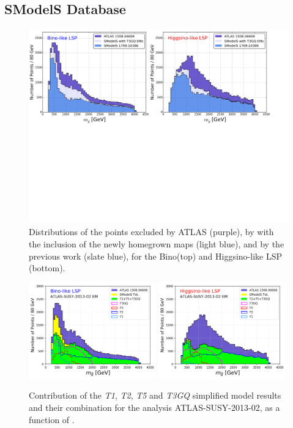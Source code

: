 \documentclass[epj,nopacs,fleqn]{svjour}
\begin{document}
\subsection{SModelS Database}
\begin{figure}
	\begin{center}
		\includegraphics[width=1\textwidth]{PLOTS/New/New_Res.pdf}	
	\end{center}
	\caption{Distributions of the points excluded by ATLAS (purple), by \SMO with the inclusion of the newly homegrown maps (light blue), and by the previous work \cite{Ambrogi:2017lov} (slate blue), for the Bino(top) and Higgsino-like LSP (bottom).}
	\label{pmssm_new_exclusion_gluino}
\end{figure}
\begin{figure}
	\begin{center}
		\subfigure
		{\includegraphics[width=0.49\textwidth]{PLOTS/Combination/Bino_Con.png}}
		\subfigure
		{\includegraphics[width=0.49\textwidth]{PLOTS/Combination/Higgsino_Con.png}}
	\end{center}
	\caption{Contribution of the \textit{T1}, \textit{T2}, \textit{T5} and \textit{T3GQ} simplified model results and their combination for the analysis ATLAS-SUSY-2013-02, as a function of \MGLU.} 
	\label{rValues}
\end{figure}
\end{document}
